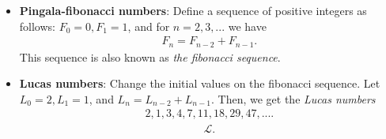\documentclass{report}
\begin{document}
\begin{itemize}
\begin{enumerate}
            \end{enumerate}
        \item \textbf{Pingala-fibonacci numbers}: Define a sequence of positive integers as follows: $F_{0} = 0, F_{1} = 1$, and for $n=2,3,... $ we have
            \begin{align*}
                F_{n} = F_{n-2} + F_{n-1}
            .\end{align*}
            This sequence is also known as \textit{the fibonacci sequence}.
        \item \textbf{Lucas numbers}: Change the initial values on the fibonacci sequence. Let $L_{0} = 2, L_{1} = 1$, and $L_{n} = L_{n-2} + L_{n-1}$. Then, we get the \textit{Lucas numbers}
            \begin{align*}
                2,1,3,4,7,11,18,29,47,...
            .\end{align*}
        \begin{align*}
            \mathcal{L}
        .\end{align*}

    \end{itemize}

    \pagebreak 
\end{document}
